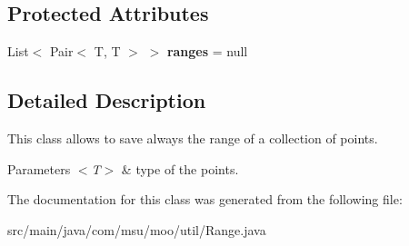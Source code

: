 \subsection*{Protected Attributes}
\begin{DoxyCompactItemize}
\item 
\hypertarget{classcom_1_1msu_1_1moo_1_1util_1_1Range_3_01T_01extends_01Comparable_3_01T_01_4_01_4_a5ca963fc0452d874af5fcd4f4f9a14c9}{List$<$ Pair$<$ T, T $>$ $>$ {\bfseries ranges} = null}\label{classcom_1_1msu_1_1moo_1_1util_1_1Range_3_01T_01extends_01Comparable_3_01T_01_4_01_4_a5ca963fc0452d874af5fcd4f4f9a14c9}

\end{DoxyCompactItemize}


\subsection{Detailed Description}
This class allows to save always the range of a collection of points.


\begin{DoxyParams}{Parameters}
{\em $<$\-T$>$} & type of the points. \\
\hline
\end{DoxyParams}


The documentation for this class was generated from the following file\-:\begin{DoxyCompactItemize}
\item 
src/main/java/com/msu/moo/util/Range.\-java\end{DoxyCompactItemize}
